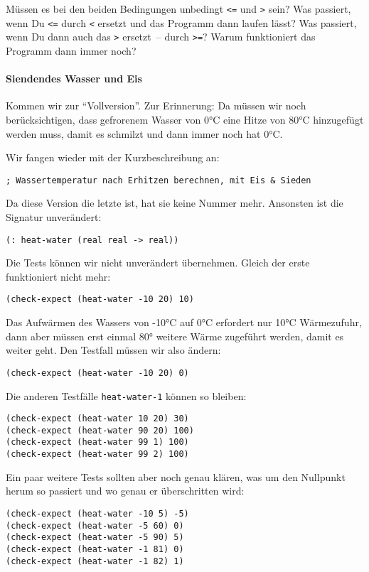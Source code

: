%
\begin{aufgabe}
  Müssen es bei den beiden Bedingungen unbedingt \verb|<=| und
  \verb|>| sein?  Was passiert, wenn Du \verb|<=| durch \verb|<|
  ersetzt und das Programm dann laufen lässt?  Was passiert, wenn Du
  dann auch das \verb|>| ersetzt~-- durch \verb|>=|?  Warum
  funktioniert das Programm dann immer noch?
\end{aufgabe}
%
\paragraph{Siendendes Wasser und Eis} Kommen wir zur "`Vollversion"'.
Zur Erinnerung: Da müssen wir noch berücksichtigen, dass gefrorenem
Wasser von 0°C eine Hitze von 80°C hinzugefügt werden muss, damit es
schmilzt und dann immer noch hat 0°C.  

Wir fangen wieder mit der Kurzbeschreibung an:
%
\begin{verbatim}
; Wassertemperatur nach Erhitzen berechnen, mit Eis & Sieden
\end{verbatim}
%
Da diese Version die letzte ist, hat sie keine Nummer mehr.  Ansonsten
ist die Signatur unverändert:
%
\begin{verbatim}
(: heat-water (real real -> real))
\end{verbatim}
%
Die Tests können wir nicht unverändert übernehmen.  Gleich der erste
funktioniert nicht mehr:
%
\begin{verbatim}
(check-expect (heat-water -10 20) 10)
\end{verbatim}
%
Das Aufwärmen des Wassers von -10°C auf 0°C erfordert nur 10°C
Wärmezufuhr, dann aber müssen erst einmal 80° weitere Wärme zugeführt
werden, damit es weiter geht.  Den Testfall müssen wir also ändern:
%
\begin{verbatim}
(check-expect (heat-water -10 20) 0)
\end{verbatim}
%
Die anderen Testfälle \texttt{heat-water-1} können so bleiben:
%
\begin{verbatim}
(check-expect (heat-water 10 20) 30)
(check-expect (heat-water 90 20) 100)
(check-expect (heat-water 99 1) 100)
(check-expect (heat-water 99 2) 100)
\end{verbatim}
%
Ein paar weitere Tests sollten aber noch genau klären, was um den
Nullpunkt herum so passiert und wo genau er überschritten wird:
%
\begin{verbatim}
(check-expect (heat-water -10 5) -5)
(check-expect (heat-water -5 60) 0)
(check-expect (heat-water -5 90) 5)
(check-expect (heat-water -1 81) 0)
(check-expect (heat-water -1 82) 1)
\end{verbatim}
